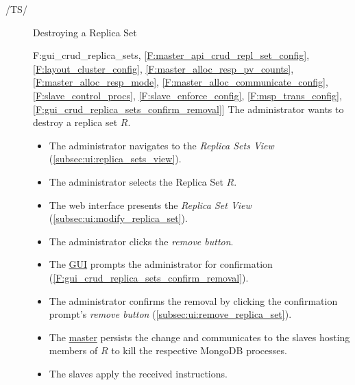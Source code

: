 \documentclass[a4paper, 11pt]{article}
\makeatletter
\def\namedlabel#1#2{\begingroup
    #2%
    \def\@currentlabel{#2}%
    \phantomsection\label{#1}\endgroup
}
\newcommand{\oitem}[2]{
  \@ifundefined{c@oitem#1}{\newcounter{oitem#1}}{} %
  \addtocounter{oitem#1}{10}
  \item[\namedlabel{#1:#2}{/#1\arabic{oitem#1}/}]
}
\newcommand{\testsequence}[3][]{
	\begin{description}[leftmargin=!,labelwidth=\widthof{\bfseries Preconditions}]
		\ifthenelse{\equal{#1}{}}
		{} %
		{\item[Tests] #1}
		\item[Preconditions] #2
		\item[Steps] #3
	\end{description}
}
\makeatother
\begin{document}
\begin{description}
\oitem{TS}{} Destroying a Replica Set
\testsequence
[\ref{F:gui_crud_replica_sets}, \ref{F:master_api_crud_repl_set_config}, \ref{F:layout_cluster_config}, \ref{F:master_alloc_resp_pv_counts}, \ref{F:master_alloc_resp_mode}, \ref{F:master_alloc_communicate_config}, \ref{F:slave_control_procs}, \ref{F:slave_enforce_config}, \ref{F:msp_trans_config}, \ref{F:gui_crud_replica_sets_confirm_removal}]
{
	The \gls{administrator} wants to destroy a \gls{replica set} $R$.
}
{
	\begin{itemize}
		\item The \gls{administrator} navigates to the \textit{Replica Sets View} (\ref{subsec:ui:replica_sets_view}).
		\item The \gls{administrator} selects the Replica Set $R$.
		\item The web interface presents the \textit{Replica Set View} (\ref{subsec:ui:modify_replica_set}).
		\item The \gls{administrator} clicks the \textit{remove button}.
		\item The \hyperref[SM:GUI]{GUI} prompts the \gls{administrator} for confirmation (\ref{F:gui_crud_replica_sets_confirm_removal}).
		\item The \gls{administrator} confirms the removal by clicking the confirmation prompt's \textit{remove button} (\ref{subsec:ui:remove_replica_set}).
		\item The \hyperref[SM:Master]{master} persists the change and communicates to the \glspl{slave} hosting members of $R$ to kill the respective \gls{MongoDB} processes.
		\item The \glspl{slave} apply the received instructions.
	\end{itemize}
}


\end{description}
\end{document}
